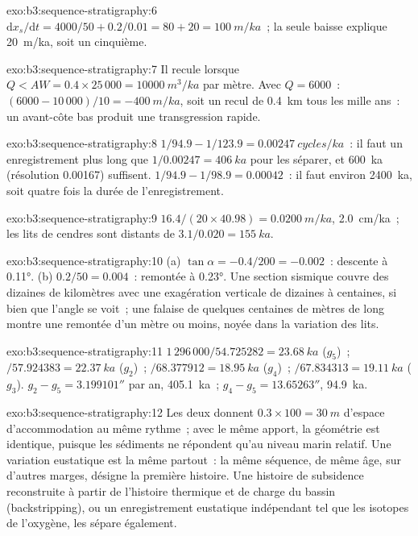 \begin{solution}{exo:b3:sequence-stratigraphy:6}
$\mathrm dx_s/\mathrm dt = 4000/50 + 0.2/0.01 = 80 + 20 = \qty{100}{m/ka}$~;
la seule baisse explique \qty{20}{m/ka}, soit un cinquième.
\end{solution}

\begin{solution}{exo:b3:sequence-stratigraphy:7}
Il recule lorsque $Q < AW = 0.4\times25\,000 = \qty{10000}{m^3/ka}$ par mètre.
Avec $Q = 6000$~: $(6000 - 10\,000)/10 = \qty{-400}{m/ka}$, soit un recul de
\qty{0.4}{km} tous les mille ans~: un avant-côte bas produit une transgression
rapide.
\end{solution}

\begin{solution}{exo:b3:sequence-stratigraphy:8}
$1/94.9 - 1/123.9 = \qty{0.00247}{cycles/ka}$~: il faut un enregistrement plus
long que $1/0.00247 = \qty{406}{ka}$ pour les séparer, et \qty{600}{ka}
(résolution 0.00167) suffisent. $1/94.9 - 1/98.9 = 0.00042$~: il faut environ
\qty{2400}{ka}, soit quatre fois la durée de l'enregistrement.
\end{solution}

\begin{solution}{exo:b3:sequence-stratigraphy:9}
$16.4/(20\times40.98) = \qty{0.0200}{m/ka}$, \qty{2.0}{cm/ka}~; les lits de
cendres sont distants de $3.1/0.020 = \qty{155}{ka}$.
\end{solution}

\begin{solution}{exo:b3:sequence-stratigraphy:10}
(a) $\tan\alpha = -0.4/200 = -0.002$~: descente à \ang{0.11}. (b)
$0.2/50 = 0.004$~: remontée à \ang{0.23}. Une section sismique couvre des
dizaines de kilomètres avec une exagération verticale de dizaines à centaines,
si bien que l'angle se voit~; une falaise de quelques centaines de mètres de
long montre une remontée d'un mètre ou moins, noyée dans la variation des lits.
\end{solution}

\begin{solution}{exo:b3:sequence-stratigraphy:11}
$1\,296\,000/54.725282 = \qty{23.68}{ka}$ ($g_5$)~; $/57.924383 =
\qty{22.37}{ka}$ ($g_2$)~; $/68.377912 = \qty{18.95}{ka}$ ($g_4$)~;
$/67.834313 = \qty{19.11}{ka}$ ($g_3$). $g_2 - g_5 = 3.199101''$ par an,
\qty{405.1}{ka}~; $g_4 - g_5 = 13.65263''$, \qty{94.9}{ka}.
\end{solution}

\begin{solution}{exo:b3:sequence-stratigraphy:12}
Les deux donnent $0.3\times100 = \qty{30}{m}$ d'espace d'accommodation au même
rythme~; avec le même apport, la géométrie est identique, puisque les sédiments
ne répondent qu'au niveau marin relatif. Une variation eustatique est la même
partout~: la même séquence, de même âge, sur d'autres marges, désigne la
première histoire. Une histoire de subsidence reconstruite à partir de
l'histoire thermique et de charge du bassin (backstripping), ou un
enregistrement eustatique indépendant tel que les isotopes de l'oxygène, les sépare également.
\end{solution}

